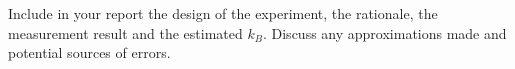 \documentclass{../lab}
\begin{document}
Include in your report the design of the experiment, the rationale, the measurement result and the estimated $k_B$. Discuss any approximations made and potential sources of errors. 














\end{document}
